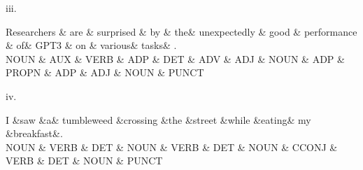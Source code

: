 iii. \\
\begin{center}
{\small
    \begin{dependency}
        \begin{deptext}
            Researchers \& are \& surprised \& by \& the\&  unexpectedly \& good \& performance \& of\&  GPT3 \& on \& various\&  tasks\& . \\
            NOUN \& AUX \& VERB \& ADP \& DET  \& ADV \& ADJ \& NOUN  \& ADP \& PROPN   \& ADP \& ADJ   \& NOUN \& PUNCT \\
        \end{deptext}
    \end{dependency}
}
\end{center}

iv. \\
\begin{center}
{
    \begin{dependency}
        \begin{deptext}
            I \&saw \&a\& tumbleweed \&crossing \&the \&street \&while \&eating\& my \&breakfast\&.  \\
            NOUN \& VERB \& DET  \& NOUN \& VERB \& DET \& NOUN  \& CCONJ     \& VERB     \& DET \& NOUN  \& PUNCT \\
        \end{deptext}
    \end{dependency}
}
\end{center}